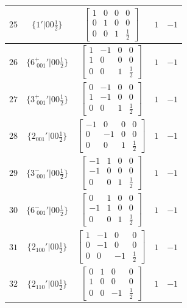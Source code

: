 \documentclass[fleqn,8pt]{jsarticle}
\begin{document}
\begin{longtable}{ccccc}
$ 25 $ & $ \{1{}'|0 0 \frac{1}{2}\} $ & $ \begin{bmatrix} 1 & 0 & 0 & 0 \\ 0 & 1 & 0 & 0 \\ 0 & 0 & 1 & \frac{1}{2} \end{bmatrix} $ & $ 1 $ & $ -1 $ \\ \hline
$ 26 $ & $ \{6^{+}_{\,\,001}{}'|0 0 \frac{1}{2}\} $ & $ \begin{bmatrix} 1 & -1 & 0 & 0 \\ 1 & 0 & 0 & 0 \\ 0 & 0 & 1 & \frac{1}{2} \end{bmatrix} $ & $ 1 $ & $ -1 $ \\ \hline
$ 27 $ & $ \{3^{+}_{\,\,001}{}'|0 0 \frac{1}{2}\} $ & $ \begin{bmatrix} 0 & -1 & 0 & 0 \\ 1 & -1 & 0 & 0 \\ 0 & 0 & 1 & \frac{1}{2} \end{bmatrix} $ & $ 1 $ & $ -1 $ \\ \hline
$ 28 $ & $ \{2{}_{001}{}'|0 0 \frac{1}{2}\} $ & $ \begin{bmatrix} -1 & 0 & 0 & 0 \\ 0 & -1 & 0 & 0 \\ 0 & 0 & 1 & \frac{1}{2} \end{bmatrix} $ & $ 1 $ & $ -1 $ \\ \hline
$ 29 $ & $ \{3^{-}_{\,\,001}{}'|0 0 \frac{1}{2}\} $ & $ \begin{bmatrix} -1 & 1 & 0 & 0 \\ -1 & 0 & 0 & 0 \\ 0 & 0 & 1 & \frac{1}{2} \end{bmatrix} $ & $ 1 $ & $ -1 $ \\ \hline
$ 30 $ & $ \{6^{-}_{\,\,001}{}'|0 0 \frac{1}{2}\} $ & $ \begin{bmatrix} 0 & 1 & 0 & 0 \\ -1 & 1 & 0 & 0 \\ 0 & 0 & 1 & \frac{1}{2} \end{bmatrix} $ & $ 1 $ & $ -1 $ \\ \hline
$ 31 $ & $ \{2{}_{100}{}'|0 0 \frac{1}{2}\} $ & $ \begin{bmatrix} 1 & -1 & 0 & 0 \\ 0 & -1 & 0 & 0 \\ 0 & 0 & -1 & \frac{1}{2} \end{bmatrix} $ & $ 1 $ & $ -1 $ \\ \hline
$ 32 $ & $ \{2{}_{110}{}'|0 0 \frac{1}{2}\} $ & $ \begin{bmatrix} 0 & 1 & 0 & 0 \\ 1 & 0 & 0 & 0 \\ 0 & 0 & -1 & \frac{1}{2} \end{bmatrix} $ & $ 1 $ & $ -1 $ \\ \hline

\end{longtable}
\end{document}
